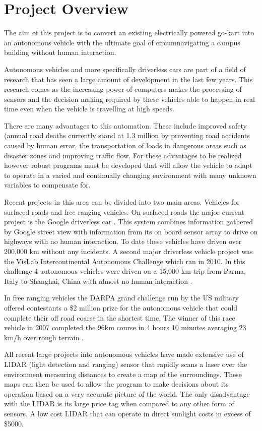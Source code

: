 \chapter{Project Overview}

The aim of this project is to convert an existing electrically powered go-kart into an autonomous vehicle with the ultimate goal of circumnavigating a campus building without human interaction.

Autonomous vehicles and more specifically driverless cars are part of a field of research that has seen a large amount of development in the last few years. This research comes as the increasing power of computers makes the processing of sensors and the decision making required by these vehicles able to happen in real time even when the vehicle is travelling at high speeds.

There are many advantages to this automation. These include improved safety (annual road deaths currently stand at 1.3 million\cite{WHO} by preventing road accidents caused by human error, the transportation of loads in dangerous areas such as disaster zones and improving traffic flow. For these advantages to be realized however robust programs must be developed that will allow the vehicle to adapt to operate in a varied and continually changing environment with many unknown variables to compensate for.

Recent projects in this area can be divided into two main areas. Vehicles for surfaced roads and free ranging vehicles. On surfaced roads the major current project is the Google driverless car \cite{google_car_blog}. This system combines information gathered by Google street view with information from its on board sensor array to drive on highways with no human interaction. To date these vehicles have driven over 200,000 km without any incidents. A second major driverless vehicle project was the VisLab Intercontinental Autonomous Challenge which ran in 2010. In this challenge 4 autonomous vehicles were driven on a 15,000 km trip from Parma, Italy to Shanghai, China with almost no human interaction \cite{vislab}.

 In free ranging vehicles the DARPA grand challenge run by the US military offered contestants a \$2 million prize for the autonomous vehicle that could complete their off road coarse in the shortest time. The winner of this race vehicle in 2007 completed the 96km course in 4 hours 10 minutes averaging 23 km/h over rough terrain \cite{darpa}.

All recent large projects into autonomous vehicles have made extensive use of LIDAR (light detection and ranging) sensor that rapidly scans a laser over the environment measuring distances to create a map of the surroundings. These maps can then be used to allow the program to make decisions about its operation based on a very accurate picture of the world. The only disadvantage with the LIDAR is its large price tag when compared to any other form of sensors. A low cost LIDAR that can operate in direct sunlight costs in excess of \$5000. 


